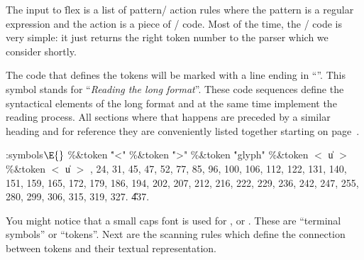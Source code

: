 The input to \.{flex} is a list of pattern/\kern -1pt action rules where the pattern is a regular
expression and the action is a piece of \CEE/ code.
Most of the time, the \CEE/ code is very simple: it just returns the right token number
to the parser which we consider shortly.

The code that defines the tokens will be marked with a line ending in ``\redsymbol''.
This symbol stands for ``{\it Reading the long format\/}''.
These code sequences define the syntactical elements of the long format and at the same time
implement the reading process. All sections where that happens are preceded by a similar heading
and for reference they are conveniently listed together starting on page~\pageref{codeindex}.

\Y\par
\par
\par
\par
\par
\Y\B\4:symbols\X${}\E{}$\6
\8\%\&{token} \5\.{"<"}\6
\8\%\&{token} \5\.{">"}\6
\8\%\&{token} \5\.{"glyph"}\6
\8\%\&{token} $<$ \|u $>$  \6
\8\%\&{token} $<$ \|u $>$ 
, 24, 31, 45, 47, 52, 77, 85, 96, 100, 106, 112, 122, 131, 140, 151, 159, 165, 172, 179, 186, 194, 202, 207, 212, 216, 222, 229, 236, 242, 247, 255, 280, 299, 306, 315, 319, 327.
\U437.\Y
\fi

You might notice that a small caps font is used for ,  or .
These are  ``terminal symbols'' or ``tokens''.
Next are the scanning rules which define the connection between tokens and their
textual representation.

